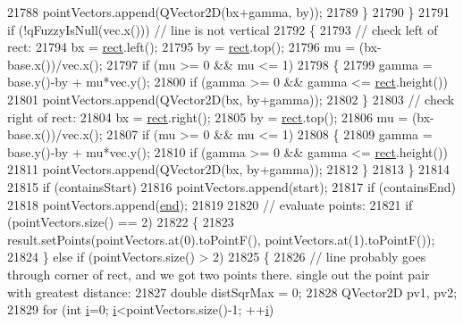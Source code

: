 \begin{DoxyCode}
21788         pointVectors.append(QVector2D(bx+gamma, by));
21789     \}
21790   \}
21791   \textcolor{keywordflow}{if} (!qFuzzyIsNull(vec.x())) \textcolor{comment}{// line is not vertical}
21792   \{
21793     \textcolor{comment}{// check left of rect:}
21794     bx = \hyperlink{_gen_blob_8m_aea8f6815d9a63491fc422c5572c6b3c3}{rect}.left();
21795     by = \hyperlink{_gen_blob_8m_aea8f6815d9a63491fc422c5572c6b3c3}{rect}.top();
21796     mu = (bx-base.x())/vec.x();
21797     \textcolor{keywordflow}{if} (mu >= 0 && mu <= 1)
21798     \{
21799       gamma = base.y()-by + mu*vec.y();
21800       \textcolor{keywordflow}{if} (gamma >= 0 && gamma <= \hyperlink{_gen_blob_8m_aea8f6815d9a63491fc422c5572c6b3c3}{rect}.height())
21801         pointVectors.append(QVector2D(bx, by+gamma));
21802     \}
21803     \textcolor{comment}{// check right of rect:}
21804     bx = \hyperlink{_gen_blob_8m_aea8f6815d9a63491fc422c5572c6b3c3}{rect}.right();
21805     by = \hyperlink{_gen_blob_8m_aea8f6815d9a63491fc422c5572c6b3c3}{rect}.top();
21806     mu = (bx-base.x())/vec.x();
21807     \textcolor{keywordflow}{if} (mu >= 0 && mu <= 1)
21808     \{
21809       gamma = base.y()-by + mu*vec.y();
21810       \textcolor{keywordflow}{if} (gamma >= 0 && gamma <= \hyperlink{_gen_blob_8m_aea8f6815d9a63491fc422c5572c6b3c3}{rect}.height())
21811         pointVectors.append(QVector2D(bx, by+gamma));
21812     \}
21813   \}
21814   
21815   \textcolor{keywordflow}{if} (containsStart)
21816     pointVectors.append(start);
21817   \textcolor{keywordflow}{if} (containsEnd)
21818     pointVectors.append(\hyperlink{class_q_c_p_item_line_a15598864c1c22a2497a1979c4980c4e1}{end});
21819   
21820   \textcolor{comment}{// evaluate points:}
21821   \textcolor{keywordflow}{if} (pointVectors.size() == 2)
21822   \{
21823     result.setPoints(pointVectors.at(0).toPointF(), pointVectors.at(1).toPointF());
21824   \} \textcolor{keywordflow}{else} \textcolor{keywordflow}{if} (pointVectors.size() > 2)
21825   \{
21826     \textcolor{comment}{// line probably goes through corner of rect, and we got two points there. single out the point pair
       with greatest distance:}
21827     \textcolor{keywordtype}{double} distSqrMax = 0;
21828     QVector2D pv1, pv2;
21829     \textcolor{keywordflow}{for} (\textcolor{keywordtype}{int} \hyperlink{_comparision_pictures_2_createtest_image_8m_a6f6ccfcf58b31cb6412107d9d5281426}{i}=0; \hyperlink{_comparision_pictures_2_createtest_image_8m_a6f6ccfcf58b31cb6412107d9d5281426}{i}<pointVectors.size()-1; ++\hyperlink{_comparision_pictures_2_createtest_image_8m_a6f6ccfcf58b31cb6412107d9d5281426}{i})

\end{DoxyCode}
